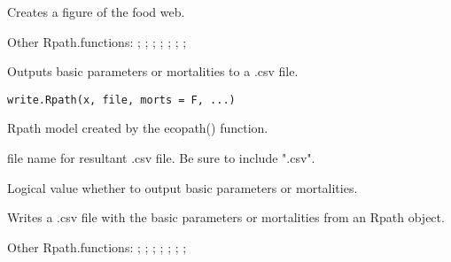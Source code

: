 \documentclass[a4paper]{book}
\begin{document}
%
\begin{Value}
Creates a figure of the food web.
\end{Value}
%
\begin{SeeAlso}\relax
Other Rpath.functions: ;
; ;
; ;
; ;
\end{SeeAlso}
%
\begin{Description}\relax
Outputs basic parameters or mortalities to a .csv file.
\end{Description}
%
\begin{Usage}
\begin{verbatim}
write.Rpath(x, file, morts = F, ...)
\end{verbatim}
\end{Usage}
%
\begin{Arguments}
\begin{ldescription}
\item[\code{x}] Rpath model created by the ecopath() function.

\item[\code{file}] file name for resultant .csv file.  Be sure to include ".csv".

\item[\code{morts}] Logical value whether to output basic parameters or mortalities.
\end{ldescription}
\end{Arguments}
%
\begin{Value}
Writes a .csv file with the basic parameters or mortalities from an Rpath object.
\end{Value}
%
\begin{SeeAlso}\relax
Other Rpath.functions: ;
; ;
; ;
; ;
\end{SeeAlso}
\end{document}
